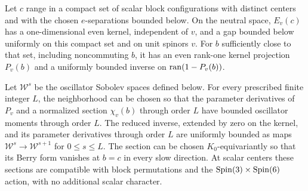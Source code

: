 \begin{lemma}\label{lem:fast-line}
Let $c$ range in a compact set of scalar block configurations with
distinct centers and with the chosen $e$-separations bounded below.
On the neutral space, $E_v(c)$ has a one-dimensional even kernel,
independent of $v$, and a gap bounded below uniformly on this compact
set and on unit spinors $v$. For $b$ sufficiently close to that set,
including noncommuting $b$, it has an even rank-one kernel projection
$P_v(b)$ and a uniformly bounded inverse on $\operatorname{ran}(1-P_v(b))$.

Let $\mathcal W^s$ be the oscillator Sobolev spaces defined below.
For every prescribed finite integer $L$, the neighborhood can be
chosen so that the parameter derivatives of $P_v$ and a normalized
section $\chi_v(b)$ through order $L$ have bounded oscillator moments
through order $L$. The reduced inverse, extended by zero on the
kernel, and its parameter derivatives through order $L$ are uniformly
bounded as maps $\mathcal W^s\to\mathcal W^{s+1}$ for
$0\leq s\leq L$. The section can be chosen
$K_0$-equivariantly so that its Berry form vanishes at $b=c$ in every
slow direction. At scalar centers these sections are compatible with
block permutations and the $\operatorname{Spin}(3)\times\operatorname{Spin}(6)$ action, with no
additional scalar character.
\end{lemma}

